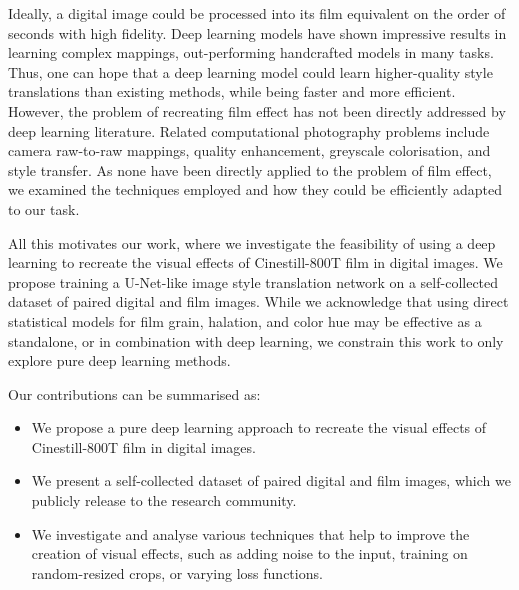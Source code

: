 Ideally, a digital image could be processed into its film equivalent on the
order of seconds with high fidelity. Deep learning models have shown impressive
results in learning complex mappings, out-performing handcrafted models in many
tasks. Thus, one can hope that a deep learning model could learn higher-quality
style translations than existing methods, while being faster and more efficient.
However, the problem of recreating film effect has not been directly addressed
by deep learning literature. Related computational photography problems include
camera raw-to-raw mappings, quality enhancement, greyscale colorisation, and
style transfer. As none have been directly applied to the problem of film
effect, we examined the techniques employed and how they could be
efficiently adapted to our task.

All this motivates our work, where we investigate the feasibility of using a
deep learning to recreate the visual effects of Cinestill-800T film in digital
images. We propose training a U-Net-like image style translation network on a
self-collected dataset of paired digital and film images. While we acknowledge
that using direct statistical models for film grain, halation, and color hue may
be effective as a standalone, or in combination with deep learning, we constrain
this work to only explore pure deep learning methods.

Our contributions can be summarised as:

\begin{itemize}
    \item We propose a  pure deep learning approach to recreate the visual effects of Cinestill-800T film in digital images.
    \item We present a self-collected dataset of paired digital and film images, which we publicly release to the research community.
    \item We investigate and analyse various techniques that help to improve the creation of visual effects, such as adding noise to the input, training on random-resized crops, or varying loss functions.
\end{itemize}